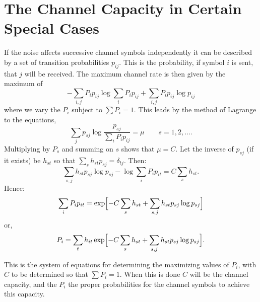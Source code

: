 \section{The Channel Capacity in Certain Special Cases}

If the noise affects successive channel symbols independently it can
be described by a set of transition probabilities $p_{ij}$.  This is
the probability, if symbol $i$ is sent, that $j$ will be received.
The maximum channel rate is then given by the maximum of
$$
-\sum_{i,j} P_i p_{ij} \log \sum_i P_i p_{ij}
	+\sum_{i,j} P_i p_{ij} \log p_{ij}
$$
where we vary the $P_i$ subject to $\sum P_i = 1$.  This leads by the
method of Lagrange to the equations,
$$
\sum_j p_{sj} \log \frac{p_{sj}}{\sum_i P_i p_{ij}} = \mu
\qquad
s = 1,2,\dots.
$$
Multiplying by $P_s$ and summing on $s$ shows that
$\mu = C$.  Let the
inverse of $p_{sj}$ (if it exists) be $h_{st}$ so that $\sum_s h_{st}
p_{sj} = \delta_{tj}$.  Then:
$$
\sum_{s,j} h_{st} p_{sj} \log p_{sj} - \log \sum_{i} P_i p_{it}
	 = C \sum_s h_{st}.
$$
Hence:
$$
\sum_i P_i p_{it} = \exp \Bigl[- C \sum_s h_{st}
	 + \sum_{s,j} h_{st} p_{sj} \log p_{sj} \Bigr]
$$
or,
$$
P_i = \sum_t h_{it} \exp \Bigl[ - C \sum_s h_{st}
	 + \sum_{s,j} h_{st} p_{sj} \log p_{sj} \Bigr].
$$

This is the system of equations for determining the maximizing values
of $P_i$, with $C$ to be determined so that $\sum P_i = 1$.  When this
is done $C$ will be the channel capacity, and the $P_i$ the proper
probabilities for the channel symbols to achieve this capacity.

